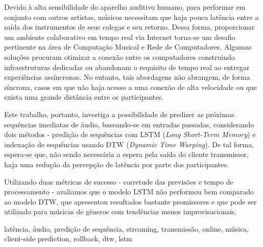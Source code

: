 \resumo
{}

Devido à alta sensibilidade do aparelho auditivo humano, para performar em conjunto com outros artistas, músicos necessitam que haja pouca latência entre a saída dos instrumentos de seus colegas e seu retorno. Dessa forma, proporcionar um ambiente colaborativo em tempo real via Internet torna-se um desafio pertinente na área de Computação Musical e Rede de Computadores. Algumas soluções procuram otimizar a conexão entre os computadores construindo infraestruturas dedicadas ou abandonam o requisito de tempo real ao entregar experiências assíncronas. No entanto, tais abordagens não abrangem, de forma síncrona, casos em que não haja acesso a uma conexão de alta velocidade ou que exista uma grande distância entre os participantes.

Este trabalho, portanto, investiga a possibilidade de predizer as próximas sequências imediatas de áudio, baseando-se em entradas passadas, considerando dois métodos - predição de sequências com LSTM (\textit{Long Short-Term Memory}) e indexação de sequências usando DTW (\textit{Dynamic Time Warping}). De tal forma, espera-se que, não sendo necessária a espera pela saída do cliente transmissor, haja uma redução da percepção de latência por parte dos participantes.

Utilizando duas métricas de sucesso - corretude das previsões e tempo de processamento - avaliamos que o modelo LSTM não performou bem comparado ao modelo DTW, que apresentou resultados bastante promissores e que pode ser utilizado para músicas de gêneros com tendências menos improvisacionais.

\begin{keywords}
latência, áudio, predição de sequência, streaming, transmissão, online, música, client-side prediction, rollback, dtw, lstm
\end{keywords}
